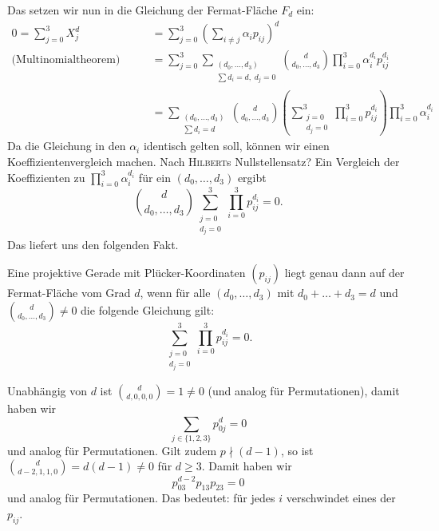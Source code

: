 Das setzen wir nun in die Gleichung der Fermat-Fläche $F_d$ ein:
\begin{align*}
0 = \sum_{j=0}^3 X_j^d &= \sum_{j=0}^3 \left(\sum_{i \neq j} \alpha_i p_{ij} \right)^d \\
\text{(Multinomialtheorem)}\qquad &= \sum_{j=0}^3 \sum_{\substack{(d_0,\dots,d_3) \\ \sum d_i=d,\;d_j=0}} \binom d{d_0,\dots,d_3} \prod_{i=0}^3 \alpha_i^{d_i} p_{ij}^{d_i} \\
	&= \sum_{\substack{(d_0,\dots,d_3) \\ \sum d_i=d}} \binom d{d_0,\dots,d_3} \left(\sum_{\substack{j=0 \\ d_j=0}}^3 \prod_{i=0}^3 p_{ij}^{d_i} \right) \prod_{i=0}^3 \alpha_i^{d_i}
\end{align*}
Da die Gleichung in den $\alpha_i$ identisch gelten soll, können wir einen Koeffizientenvergleich machen. \note Nach \textsc{Hilbert}s Nullstellensatz? Ein Vergleich der Koeffizienten zu $\prod_{i=0}^3 \alpha_i^{d_i}$ für ein $(d_0,\dots,d_3)$ ergibt
\begin{equation}
\binom d{d_0,\dots,d_3} \sum_{\substack{j=0 \\ d_j=0}}^3 \prod_{i=0}^3 p_{ij}^{d_i} = 0.
\end{equation}
Das liefert uns den folgenden Fakt.

\begin{fact}
Eine projektive Gerade mit Plücker-Koordinaten $(p_{ij})$ liegt genau dann auf der Fermat-Fläche vom Grad $d$, wenn für alle $(d_0,\dots,d_3)$ mit $d_0 + \dots + d_3 = d$ und $\binom d{d_0,\dots,d_3} \neq 0$ die folgende Gleichung gilt:
\begin{equation}
\sum_{\substack{j=0 \\ d_j=0}}^3 \prod_{i=0}^3 p_{ij}^{d_i} = 0.
\end{equation}
\end{fact}

\noindent Unabhängig von $d$ ist $\binom d{d,0,0,0} = 1 \neq 0$ (und analog für Permutationen), damit haben wir
\begin{equation} \label{eq:powers}
\sum_{j\in\{1,2,3\}} p_{0j}^d = 0
\end{equation}
und analog für Permutationen. Gilt zudem $p \nmid (d-1)$, so ist $\binom d{d-2,1,1,0} = d(d-1) \neq 0$ für $d \geq 3$. Damit haben wir
\begin{equation} \label{eq:products}
p_{03}^{d-2} p_{13} p_{23} = 0
\end{equation}
und analog für Permutationen. Das bedeutet: für jedes $i$ verschwindet eines der $p_{ij}$.

